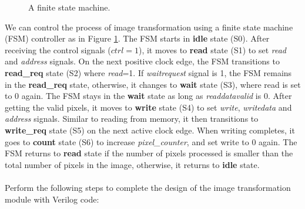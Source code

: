 \documentclass[epsfig,10pt,fullpage]{article}
\begin{document}
\begin{figure}[h]
\begin{center}
\end{center}
\caption{A finite state machine.}
\label{fig:FSM}
\end{figure}

\noindent
We can control the process of image transformation using a finite state machine (FSM) controller as in Figure \ref{fig:FSM}. The FSM starts in \textbf{idle} state (S0). After receiving the control signals ($ctrl=1$), it moves to \textbf{read} state (S1) to set \emph{read} and \emph{address} signals. On the next positive clock edge, the FSM transitions to \textbf{read\_req} state (S2) where \emph{read}=1. If \emph{waitrequest} signal is 1, the FSM remains in the \textbf{read\_req} state, otherwise, it changes to \textbf{wait} state (S3), where read is set to 0 again. The FSM stays in the \textbf{wait} state as long as \emph{readdatavalid} is 0. After getting the valid pixels, it moves to \textbf{write} state (S4) to set \emph{write}, \emph{writedata} and \emph{address} signals. Similar to reading from memory, it then transitions to \textbf{write\_req} state (S5) on the next active clock edge. When writing completes, it goes to \textbf{count} state (S6) to increase \emph{pixel\_counter}, and set write to 0 again. The FSM returns to \textbf{read} state if the number of pixels processed is smaller than the total number of pixels in the image, otherwise, it returns to \textbf{idle} state.\\
\\
Perform the following steps to complete the design of the image transformation module with Verilog code:
\end{document}
